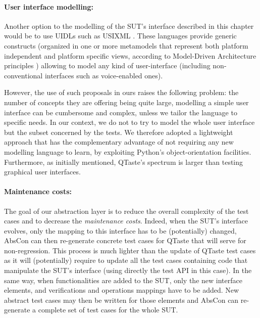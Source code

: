 \paragraph{User interface modelling:}

Another option to the modelling of the SUT's interface described in this chapter would be to use \glspl{UIDL} \cite{Guerrero-Garcia2009} such as USIXML \cite{Limbourg2005}. These languages provide generic constructs (organized in one or more metamodels that represent both platform independent and platform specific views, according to Model-Driven Architecture principles \cite{Kleppe2003})  allowing to model any kind of user-interface (including non-conventional interfaces such as voice-enabled ones). 

However, the use of such proposals in ours raises the following problem: the number of concepts they are offering being quite large, modelling a simple user interface can be cumbersome and complex, unless we tailor the language to specific needs. In our context, we do not to try to model the whole user interface but the subset concerned by the tests. We therefore adopted a lightweight approach that has the complementary advantage of not requiring any new modelling language to learn, by exploiting Python's object-orientation facilities.  Furthermore, as initially mentioned, QTaste's spectrum is larger than testing graphical user interfaces.


\paragraph{Maintenance costs:}

The goal of our abstraction layer is to reduce the overall complexity of the test cases and to decrease the \emph{maintenance costs}. Indeed, when the SUT's interface evolves, only the mapping to this interface has to be (potentially) changed, AbsCon can then re-generate concrete test cases for QTaste that will serve for non-regression. This process is much lighter than the update of QTaste test cases as it will (potentially) require to update all the test cases containing code that manipulate the SUT's interface (using directly the test API in this case). In the same way, when functionalities are added to the SUT, only the new interface elements, and verifications and operations mappings have to be added. New abstract test cases may then be written for those elements and AbsCon can re-generate a complete set of test cases for the whole SUT.

